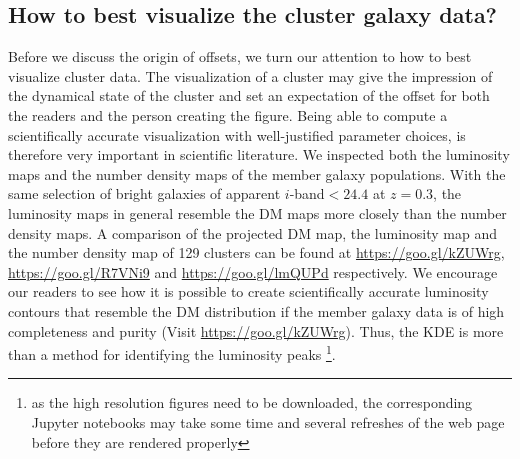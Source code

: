 \subsection{How to best visualize the cluster galaxy data?}
Before we discuss the origin of offsets, we turn our attention to how to best
visualize cluster data. The visualization of a cluster may give
the impression of the dynamical state of the cluster and set an expectation of
the offset for both the readers and the person creating the figure. 
Being able to compute a scientifically accurate visualization
with well-justified parameter choices, is therefore very important in scientific literature.
We inspected both the luminosity maps and the
number density maps of the member galaxy populations.
With the same selection of bright galaxies of apparent $i$-band$ < 24.4$ at
$z=0.3$, the luminosity maps in general resemble the DM maps more closely than 
the number density maps.
A comparison of the projected 
DM map, the luminosity map and the number density map of 129 clusters 
can be found at \href{https://goo.gl/kZUWrg}{https://goo.gl/kZUWrg}, 
\href{https://goo.gl/R7VNi9}{https://goo.gl/R7VNi9} and
\href{https://goo.gl/lmQUPd}{https://goo.gl/lmQUPd} respectively. 
We encourage our readers to see how it is possible
to create scientifically accurate luminosity contours 
that resemble 
the DM distribution if the member galaxy
data is of high completeness and purity (Visit
\href{https://goo.gl/kZUWrg}{https://goo.gl/kZUWrg}). Thus, 
the KDE is more than a method for
identifying the luminosity peaks
\footnote{as the high resolution figures need to be downloaded, the 
corresponding Jupyter notebooks may take some time and several refreshes of the
web page before they are rendered properly}.

% 

